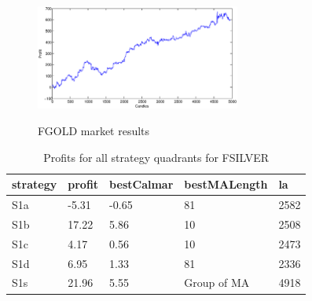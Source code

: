 \documentclass{tewiart}
\begin{document}
\begin{figure}[h]
\begin{minipage}{.49\linewidth}
\label{mansard}
\end{minipage}
\begin{minipage}{\linewidth}
\centering 
\includegraphics[width=0.6\textwidth]{images/S1s_gold.eps}
\label{mansard}
\end{minipage}
\caption{FGOLD market results}
\end{figure}
\FloatBarrier



\newpage
\begin{table}[!t]
\caption{Profits for all strategy quadrants for FSILVER} 
 \begin{center} 
 \begin{tabular}{|l|l|l|l|l|} 
 \hline \textbf{strategy} & \textbf{profit} & \textbf{bestCalmar} & \textbf{bestMALength} & \textbf{la} \\ \hline  
S1a & -5.31 & -0.65 & 81 & 2582\\ \hline 
S1b & 17.22 & 5.86 & 10 & 2508\\ \hline 
S1c & 4.17 & 0.56 & 10 & 2473\\ \hline 
S1d & 6.95 & 1.33 & 81 & 2336\\ \hline 
S1s & 21.96 & 5.55 & Group of MA & 4918\\ 
\hline \end{tabular} 
 \end{center} 
 \end{table}
\FloatBarrier
\end{document}
